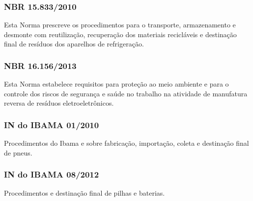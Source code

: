\begin{subapend}
\begin{subsubapend}
		\subsubsection{NBR 15.833/2010}
		Esta Norma prescreve os procedimentos para o transporte, armazenamento e desmonte com reutilização, recuperação dos materiais recicláveis e destinação final de resíduos dos aparelhos de refrigeração.
		\subsubsection{NBR 16.156/2013}
		Esta Norma estabelece requisitos para proteção ao meio ambiente e para o controle dos riscos de segurança e saúde no trabalho na atividade de manufatura reversa de resíduos eletroeletrônicos.
		\subsubsection{IN do IBAMA 01/2010}
		Procedimentos do Ibama e sobre fabricação, importação, coleta e destinação final de pneus.
		\subsubsection{IN do IBAMA 08/2012}
		Procedimentos e destinação final de pilhas e baterias.
	\end{subsubapend}
\end{subapend}

